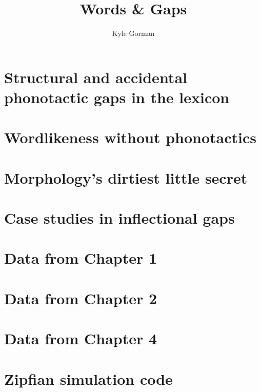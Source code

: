 \documentclass{upenndiss}
\title{Words \& Gaps}
\author{Kyle Gorman}
\begin{document}
\frenchspacing

\FrontMatter

\chapter{Structural and accidental phonotactic gaps in the lexicon}


\chapter{Wordlikeness without phonotactics}


\chapter{Morphology's dirtiest little secret}


\chapter{Case studies in inflectional gaps}


\appendix

\chapter{Data from Chapter 1}


\chapter{Data from Chapter 2}


\chapter{Data from Chapter 4}
\lipsum


\chapter{Zipfian simulation code}

\lstset{language=Python, basicstyle=\scriptsize\ttfamily, showstringspaces=false, upquote=false}




\end{document}

